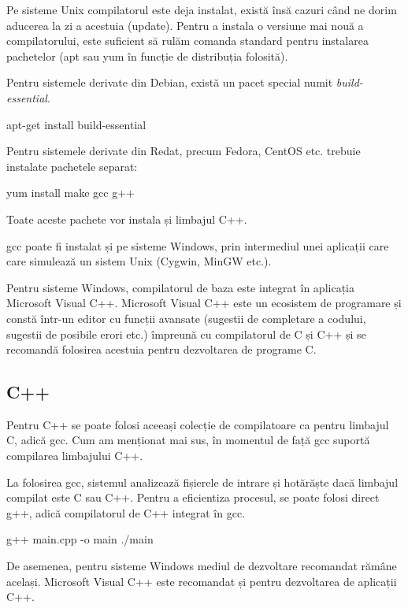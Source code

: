 Pe sisteme Unix compilatorul este deja instalat, există însă cazuri când ne
dorim aducerea la zi a acestuia (update). Pentru a instala o versiune mai nouă a
compilatorului, este suficient să rulăm comanda standard pentru instalarea
pachetelor (apt sau yum în funcție de distribuția folosită).

Pentru sistemele derivate din Debian, există un pacet special numit
\textit{build-essential}.

\begin{screen}
apt-get install build-essential
\end{screen}

Pentru sistemele derivate din Redat, precum Fedora, CentOS etc. trebuie
instalate pachetele separat:

\begin{screen}
yum install make gcc g++
\end{screen}

Toate aceste pachete vor instala și limbajul C++.

gcc poate fi instalat și pe sisteme Windows, prin intermediul unei aplicații
care care simulează un sistem Unix (Cygwin, MinGW etc.).

Pentru sisteme Windows, compilatorul de baza este integrat în aplicația
Microsoft Visual C++. Microsoft Visual C++ este un ecosistem de programare și
constă într-un editor cu funcții avansate (sugestii de completare a codului,
sugestii de posibile erori etc.) împreună cu compilatorul de C și C++ și se
recomandă folosirea acestuia pentru dezvoltarea de programe C.

\subsection{C++}
\label{sec:appdev-ideinstall-cpp}

Pentru C++ se poate folosi aceeași colecție de compilatoare ca pentru limbajul
C, adică gcc. Cum am menționat mai sus, în momentul de față gcc suportă
compilarea limbajului C++.

La folosirea gcc, sistemul analizează fișierele de intrare și hotărăște dacă
limbajul compilat este C sau C++. Pentru a eficientiza procesul, se poate folosi
direct g++, adică compilatorul de C++ integrat în gcc.

\begin{screen}
g++ main.cpp -o main
./main
\end{screen}

De asemenea, pentru sisteme Windows mediul de dezvoltare recomandat rămâne
același. Microsoft Visual C++ este recomandat și pentru dezvoltarea de aplicații
C++.

